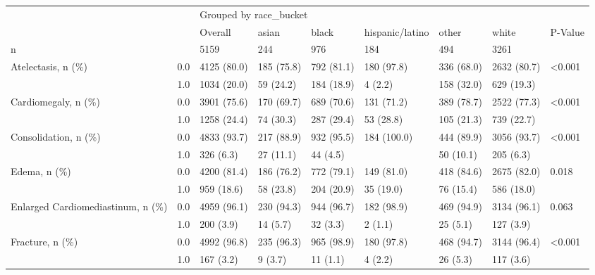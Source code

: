 \begin{tabular}{lllllllll}
\toprule
                       &     & \multicolumn{7}{l}{Grouped by race\_bucket} \\
                       &     &                Overall &        asian &       black & hispanic/latino &       other &        white & P-Value \\
\midrule
n & {} &                   5159 &          244 &         976 &             184 &         494 &         3261 &         \\
Atelectasis, n (\%) & 0.0 &            4125 (80.0) &   185 (75.8) &  792 (81.1) &      180 (97.8) &  336 (68.0) &  2632 (80.7) &  <0.001 \\
                       & 1.0 &            1034 (20.0) &    59 (24.2) &  184 (18.9) &         4 (2.2) &  158 (32.0) &   629 (19.3) &         \\
Cardiomegaly, n (\%) & 0.0 &            3901 (75.6) &   170 (69.7) &  689 (70.6) &      131 (71.2) &  389 (78.7) &  2522 (77.3) &  <0.001 \\
                       & 1.0 &            1258 (24.4) &    74 (30.3) &  287 (29.4) &       53 (28.8) &  105 (21.3) &   739 (22.7) &         \\
Consolidation, n (\%) & 0.0 &            4833 (93.7) &   217 (88.9) &  932 (95.5) &     184 (100.0) &  444 (89.9) &  3056 (93.7) &  <0.001 \\
                       & 1.0 &              326 (6.3) &    27 (11.1) &    44 (4.5) &                 &   50 (10.1) &    205 (6.3) &         \\
Edema, n (\%) & 0.0 &            4200 (81.4) &   186 (76.2) &  772 (79.1) &      149 (81.0) &  418 (84.6) &  2675 (82.0) &   0.018 \\
                       & 1.0 &             959 (18.6) &    58 (23.8) &  204 (20.9) &       35 (19.0) &   76 (15.4) &   586 (18.0) &         \\
Enlarged Cardiomediastinum, n (\%) & 0.0 &            4959 (96.1) &   230 (94.3) &  944 (96.7) &      182 (98.9) &  469 (94.9) &  3134 (96.1) &   0.063 \\
                       & 1.0 &              200 (3.9) &     14 (5.7) &    32 (3.3) &         2 (1.1) &    25 (5.1) &    127 (3.9) &         \\
Fracture, n (\%) & 0.0 &            4992 (96.8) &   235 (96.3) &  965 (98.9) &      180 (97.8) &  468 (94.7) &  3144 (96.4) &  <0.001 \\
                       & 1.0 &              167 (3.2) &      9 (3.7) &    11 (1.1) &         4 (2.2) &    26 (5.3) &    117 (3.6) &         \\

\end{tabular}
